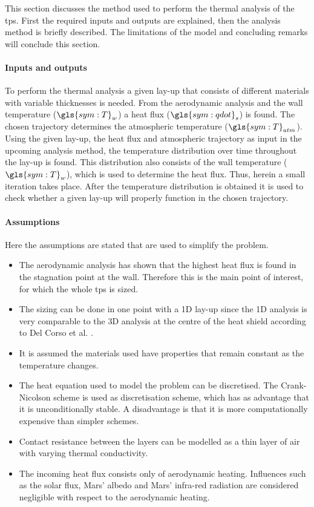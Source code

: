 This section discusses the method used to perform the thermal analysis of the \gls{tps}. First the required inputs and outputs are explained, then the analysis method is briefly described. The limitations of the model and concluding remarks will conclude this section.

\paragraph{Inputs and outputs}
To perform the thermal analysis a given lay-up that consists of different materials with variable thicknesses is needed. From the aerodynamic analysis and the wall temperature ($\gls{sym:T}_w$) a heat flux ($\gls{sym:qdot}_s$) is found. The chosen trajectory determines the atmospheric temperature ($\gls{sym:T}_{atm}$). Using the given lay-up, the heat flux and atmospheric trajectory as input in the upcoming analysis method, the temperature distribution over time throughout the lay-up is found. This distribution also consists of the wall temperature ($\gls{sym:T}_w$), which is used to determine the heat flux. Thus, herein a small iteration takes place. After the temperature distribution is obtained it is used to check whether a given lay-up will properly function in the chosen trajectory.

\paragraph{Assumptions}
Here the assumptions are stated that are used to simplify the problem.
\begin{itemize}
	\item The aerodynamic analysis has shown that the highest heat flux is found in the stagnation point at the wall. Therefore this is the main point of interest, for which the whole \gls{tps} is sized.
	\item The sizing can be done in one point with a 1D lay-up since the 1D analysis is very comparable to the 3D analysis at the centre of the heat shield according to Del Corso et al. \cite{Corso2009}.
	\item It is assumed the materials used have properties that remain constant as the temperature changes. 
	\item The heat equation used to model the problem can be discretised. The Crank-Nicolson scheme is used as discretisation scheme, which has as advantage that it is unconditionally stable. A disadvantage is that it is more computationally expensive than simpler schemes.
	\item Contact resistance between the layers can be modelled as a thin layer of air with varying thermal conductivity.
	\item The incoming heat flux consists only of aerodynamic heating. Influences such as the solar flux, Mars' albedo and Mars' infra-red radiation are considered negligible with respect to the aerodynamic heating.
\end{itemize}


